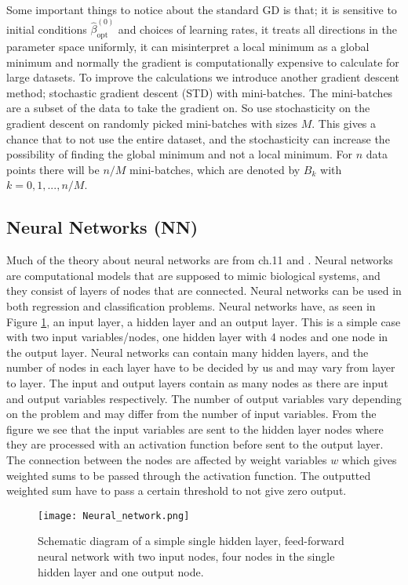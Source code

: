 \documentclass[12pt,a4paper,english]{article}
\begin{document}
Some important things to notice about the standard GD is that; it is sensitive to initial conditions $\hat{\beta}^{(0)}_{\text{opt}}$ and choices of learning rates, it treats all directions in the parameter space uniformly, it can misinterpret a local minimum as a global minimum and normally the gradient is computationally expensive to calculate for large datasets. To improve the calculations we introduce another gradient descent method; stochastic gradient descent (STD) with mini-batches. The mini-batches are a subset of the data to take the gradient on. So use stochasticity on the gradient descent on randomly picked mini-batches with sizes $M$. This gives a chance that to not use the entire dataset, and the stochasticity can increase the possibility of finding the global minimum and not a local minimum. For $n$ data points there will be $n/M$ mini-batches, which are denoted by $B_k$ with $k=0,1,...,n/M$.

\subsection{Neural Networks (NN)}
\label{sect:NN}
Much of the theory about neural networks are from \citet{hastie2009} ch.11 and \citet{morten_NN}. Neural networks are computational models that are supposed to mimic biological systems, and they consist of layers of nodes that are connected. Neural networks can be used in both regression and classification problems. Neural networks have, as seen in Figure \ref{fig:Neural_network}, an input layer, a hidden layer and an output layer. This is a simple case with two input variables/nodes, one hidden layer with 4 nodes and one node in the output layer. Neural networks can contain many hidden layers, and the number of nodes in each layer have to be decided by us and may vary from layer to layer. The input and output layers contain as many nodes as there are input and output variables respectively. The number of output variables vary depending on the problem and may differ from the number of input variables. From the figure we see that the input variables are sent to the hidden layer nodes where they are processed with an activation function before sent to the output layer. The connection between the nodes are affected by weight variables $w$ which gives weighted sums to be passed through the activation function. The outputted weighted sum have to pass a certain threshold to not give zero output.

\begin{figure}[htbp]
	\centering\texttt{[image: Neural\_network.png]}
	\caption{Schematic diagram of a simple single hidden layer, feed-forward neural network with two input nodes, four nodes in the single hidden layer and one output node.\label{fig:Neural_network}}
\end{figure} 
\end{document}

